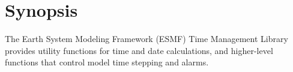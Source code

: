 \section{Synopsis}

The Earth System Modeling Framework (ESMF) Time Management Library provides utility functions for time and date calculations, and higher-level functions that control model time stepping and alarms.  








